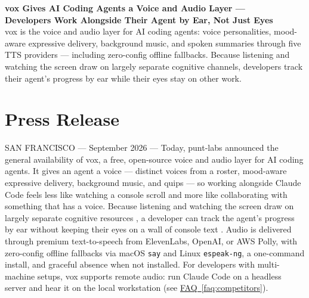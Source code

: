 \documentclass[11pt,letterpaper]{article}
\newcommand{\faqref}[1]{\hyperref[#1]{FAQ~\ref*{#1}}}
\begin{document}
\begin{center}
  {\LARGE\bfseries\color{SectionBlue}
    vox Gives AI Coding Agents a Voice and Audio Layer ---\\
    Developers Work Alongside Their Agent by Ear, Not Just Eyes} \\[0.8em]
  {\large\color{AccentGray}
    vox is the voice and audio layer for AI coding agents: voice
    personalities, mood-aware expressive delivery, background music, and
    spoken summaries through five TTS providers --- including zero-config
    offline fallbacks. Because listening and watching the screen draw on
    largely separate cognitive channels, developers track their agent's
    progress by ear while their eyes stay on other work.}
\end{center}

\vspace{0.5em}


\section*{Press Release}

SAN FRANCISCO --- September 2026 --- Today, punt-labs announced the general
availability of vox, a free, open-source voice and audio layer for AI
coding agents. It gives an agent a voice --- distinct voices from a roster,
mood-aware expressive delivery, background music, and quips --- so working
alongside Claude Code feels less like watching a console scroll and more like
collaborating with something that has a voice. Because listening and watching
the screen draw on largely separate cognitive resources
\cite{baddeleyhitch1974workingmemory,baddeley2000episodicbuffer}, a developer
can track the agent's progress by ear without keeping their eyes on a wall of
console text \cite{springer2016audiovisual,mccrickardchewar2003attuning}.
Audio is delivered through premium
text-to-speech from ElevenLabs, OpenAI, or AWS Polly, with zero-config offline
fallbacks via macOS \texttt{say} and Linux \texttt{espeak-ng}, a one-command
install, and graceful absence when not installed. For developers with
multi-machine setups, vox supports remote audio: run Claude Code on a
headless server and hear it on the local workstation
(see \faqref{faq:competitors}).
\end{document}
